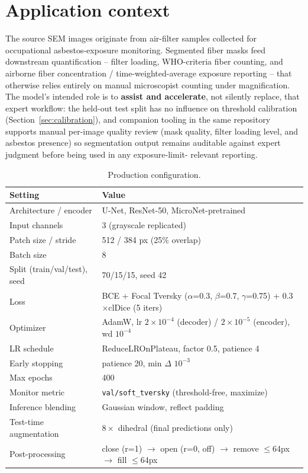 \documentclass[11pt]{article}
\begin{document}
\section{Application context}

The source SEM images originate from air-filter samples collected for
occupational asbestos-exposure monitoring. Segmented fiber masks feed
downstream quantification -- filter loading, WHO-criteria fiber counting,
and airborne fiber concentration / time-weighted-average exposure
reporting -- that otherwise relies entirely on manual microscopist counting
under magnification. The model's intended role is to \textbf{assist and
accelerate}, not silently replace, that expert workflow: the held-out test
split has no influence on threshold calibration
(Section~\ref{sec:calibration}), and companion tooling in the same
repository supports manual per-image quality review (mask quality, filter
loading level, and asbestos presence) so segmentation output remains
auditable against expert judgment before being used in any exposure-limit-
relevant reporting.

\begin{table}[h]
\centering
\begin{tabular}{@{}ll@{}}
\toprule
Setting & Value \\
\midrule
Architecture / encoder & U-Net, ResNet-50, MicroNet-pretrained \\
Input channels & 3 (grayscale replicated) \\
Patch size / stride & 512 / 384 px (25\% overlap) \\
Batch size & 8 \\
Split (train/val/test), seed & 70/15/15, seed 42 \\
Loss & BCE + Focal Tversky ($\alpha$=0.3, $\beta$=0.7, $\gamma$=0.75) + 0.3$\times$clDice (5 iters) \\
Optimizer & AdamW, lr $2\times10^{-4}$ (decoder) / $2\times10^{-5}$ (encoder), wd $10^{-4}$ \\
LR schedule & ReduceLROnPlateau, factor 0.5, patience 4 \\
Early stopping & patience 20, min $\Delta$ $10^{-3}$ \\
Max epochs & 400 \\
Monitor metric & \texttt{val/soft\_tversky} (threshold-free, maximize) \\
Inference blending & Gaussian window, reflect padding \\
Test-time augmentation & $8\times$ dihedral (final predictions only) \\
Post-processing & close (r=1) $\rightarrow$ open (r=0, off) $\rightarrow$ remove $\leq$64px $\rightarrow$ fill $\leq$64px \\
\bottomrule
\end{tabular}
\caption{Production configuration.}
\label{tab:config}
\end{table}
\end{document}
